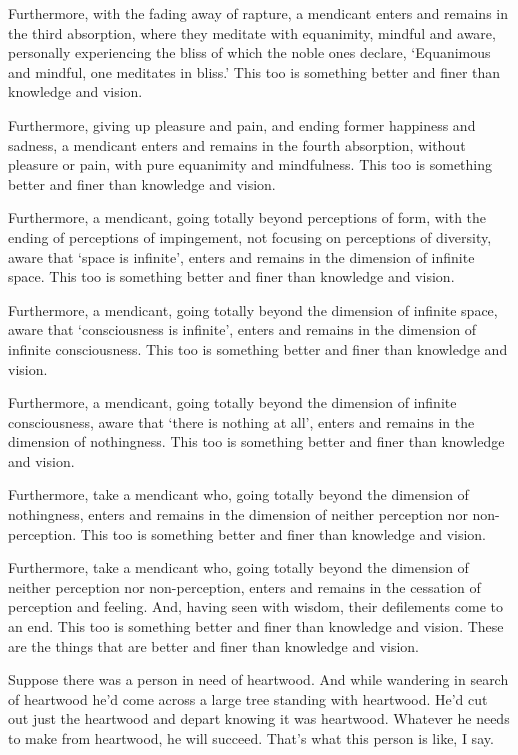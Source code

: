 \documentclass[12pt,openany]{book}%
\begin{document}
Furthermore, with the fading away of rapture, a mendicant enters and remains in the third absorption, where they meditate with equanimity, mindful and aware, personally experiencing the bliss of which the noble ones declare, ‘Equanimous and mindful, one meditates in bliss.’ This too is something better and finer than knowledge and vision. 

Furthermore, giving up pleasure and pain, and ending former happiness and sadness, a mendicant enters and remains in the fourth absorption, without pleasure or pain, with pure equanimity and mindfulness. This too is something better and finer than knowledge and vision. 

Furthermore, a mendicant, going totally beyond perceptions of form, with the ending of perceptions of impingement, not focusing on perceptions of diversity, aware that ‘space is infinite’, enters and remains in the dimension of infinite space. This too is something better and finer than knowledge and vision. 

Furthermore, a mendicant, going totally beyond the dimension of infinite space, aware that ‘consciousness is infinite’, enters and remains in the dimension of infinite consciousness. This too is something better and finer than knowledge and vision. 

Furthermore, a mendicant, going totally beyond the dimension of infinite consciousness, aware that ‘there is nothing at all’, enters and remains in the dimension of nothingness. This too is something better and finer than knowledge and vision. 

Furthermore, take a mendicant who, going totally beyond the dimension of nothingness, enters and remains in the dimension of neither perception nor non-perception. This too is something better and finer than knowledge and vision. 

Furthermore, take a mendicant who, going totally beyond the dimension of neither perception nor non-perception, enters and remains in the cessation of perception and feeling. And, having seen with wisdom, their defilements come to an end. This too is something better and finer than knowledge and vision. These are the things that are better and finer than knowledge and vision. 

Suppose there was a person in need of heartwood. And while wandering in search of heartwood he’d come across a large tree standing with heartwood. He’d cut out just the heartwood and depart knowing it was heartwood. Whatever he needs to make from heartwood, he will succeed. That’s what this person is like, I say. 
\end{document}
